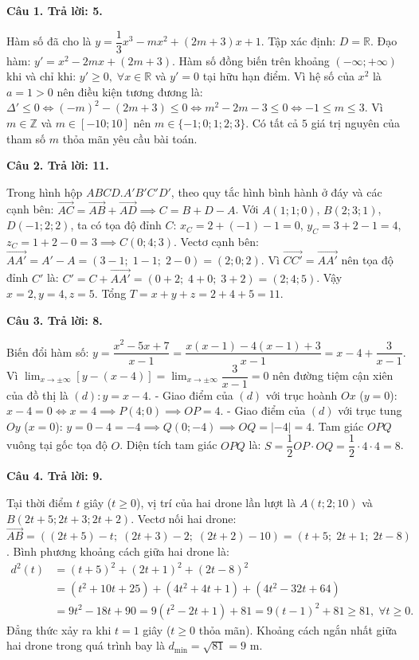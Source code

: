 \documentclass[12pt,a4paper]{article}
\newcommand{\loigiai}[1]{\par\medskip\Needspace{4\baselineskip}\noindent\textbf{#1}\par\nobreak}
\begin{document}
\loigiai{Câu 1. Trả lời: 5.}
Hàm số đã cho là $y=\dfrac{1}{3}x^3-mx^2+(2m+3)x+1$.
Tập xác định: $D=\mathbb{R}$.
Đạo hàm: $y'=x^2-2mx+(2m+3)$.
Hàm số đồng biến trên khoảng $(-\infty;+\infty)$ khi và chỉ khi:
$y'\ge 0,\;\forall x\in\mathbb{R}$ và $y'=0$ tại hữu hạn điểm.
Vì hệ số của $x^2$ là $a=1>0$ nên điều kiện tương đương là:
$\Delta' \le 0 \iff (-m)^2-(2m+3) \le 0 \iff m^2-2m-3 \le 0 \iff -1 \le m \le 3$.
Vì $m\in\mathbb{Z}$ và $m\in[-10;10]$ nên $m\in\{-1;0;1;2;3\}$.
Có tất cả $5$ giá trị nguyên của tham số $m$ thỏa mãn yêu cầu bài toán.

\loigiai{Câu 2. Trả lời: 11.}
Trong hình hộp $ABCD.A'B'C'D'$, theo quy tắc hình bình hành ở đáy và các cạnh bên:
$\vec{AC}=\vec{AB}+\vec{AD} \implies C=B+D-A$.
Với $A(1;1;0)$, $B(2;3;1)$, $D(-1;2;2)$, ta có tọa độ đỉnh $C$:
$x_C = 2+(-1)-1 = 0$, $y_C = 3+2-1 = 4$, $z_C = 1+2-0 = 3 \implies C(0;4;3)$.
Vectơ cạnh bên: $\vec{AA'}=A'-A=(3-1;\; 1-1;\; 2-0)=(2;0;2)$.
Vì $\vec{CC'}=\vec{AA'}$ nên tọa độ đỉnh $C'$ là:
$C'=C+\vec{AA'}=(0+2;\; 4+0;\; 3+2)=(2;4;5)$.
Vậy $x=2, y=4, z=5$. Tổng $T=x+y+z=2+4+5=11$.

\loigiai{Câu 3. Trả lời: 8.}
Biến đổi hàm số: $y=\dfrac{x^2-5x+7}{x-1}=\dfrac{x(x-1)-4(x-1)+3}{x-1}=x-4+\dfrac{3}{x-1}$.
Vì $\lim_{x\to\pm\infty}[y-(x-4)]=\lim_{x\to\pm\infty}\dfrac{3}{x-1}=0$ nên đường tiệm cận xiên của đồ thị là $(d): y=x-4$.
- Giao điểm của $(d)$ với trục hoành $Ox$ ($y=0$):
  $x-4=0 \iff x=4 \implies P(4;0) \implies OP=4$.
- Giao điểm của $(d)$ với trục tung $Oy$ ($x=0$):
  $y=0-4=-4 \implies Q(0;-4) \implies OQ=|-4|=4$.
Tam giác $OPQ$ vuông tại gốc tọa độ $O$. Diện tích tam giác $OPQ$ là:
$S=\dfrac{1}{2}OP\cdot OQ=\dfrac{1}{2}\cdot 4\cdot 4=8$.

\loigiai{Câu 4. Trả lời: 9.}
Tại thời điểm $t$ giây ($t\ge 0$), vị trí của hai drone lần lượt là $A(t;2;10)$ và $B(2t+5;2t+3;2t+2)$.
Vectơ nối hai drone:
$\vec{AB}=((2t+5)-t;\; (2t+3)-2;\; (2t+2)-10)=(t+5;\; 2t+1;\; 2t-8)$.
Bình phương khoảng cách giữa hai drone là:
\begin{align*}
d^2(t) &= (t+5)^2+(2t+1)^2+(2t-8)^2\\
&= (t^2+10t+25)+(4t^2+4t+1)+(4t^2-32t+64)\\
&= 9t^2-18t+90 = 9(t^2-2t+1)+81 = 9(t-1)^2+81 \ge 81,\;\forall t\ge 0.
\end{align*}
Đẳng thức xảy ra khi $t=1$ giây ($t\ge 0$ thỏa mãn).
Khoảng cách ngắn nhất giữa hai drone trong quá trình bay là $d_{\min}=\sqrt{81}=9\text{ m}$.
\end{document}
